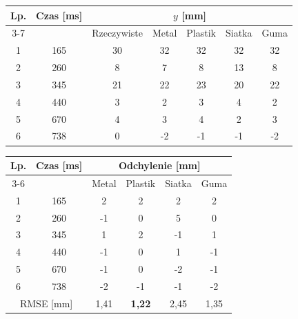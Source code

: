 \begin{tabular}{cc c cccc}
\toprule
Lp. & Czas [ms] & \multicolumn{5}{c}{$y$ [mm]} \\
\cmidrule(lr){3-7}
 &  & Rzeczywiste & Metal & Plastik & Siatka & Guma \\
\midrule
1 & 165 & 30 & 32 & 32 & 32 & 32 \\
2 & 260 & 8 & 7 & 8 & 13 & 8 \\
3 & 345 & 21 & 22 & 23 & 20 & 22 \\
4 & 440 & 3 & 2 & 3 & 4 & 2 \\
5 & 670 & 4 & 3 & 4 & 2 & 3 \\
6 & 738 & 0 & -2 & -1 & -1 & -2 \\
\bottomrule
\end{tabular}

\bigskip

\begin{tabular}{cc cccc}
\toprule
Lp. & Czas [ms] & \multicolumn{4}{c}{Odchylenie [mm]} \\
\cmidrule(lr){3-6}
 &  & Metal & Plastik & Siatka & Guma \\
\midrule
1 & 165 & 2 & 2 & 2 & 2 \\
2 & 260 & -1 & 0 & 5 & 0 \\
3 & 345 & 1 & 2 & -1 & 1 \\
4 & 440 & -1 & 0 & 1 & -1 \\
5 & 670 & -1 & 0 & -2 & -1 \\
6 & 738 & -2 & -1 & -1 & -2 \\
\midrule
\multicolumn{2}{c}{RMSE [mm]} & 1,41 & \textbf{1,22} & 2,45 & 1,35 \\
\bottomrule
\end{tabular}
